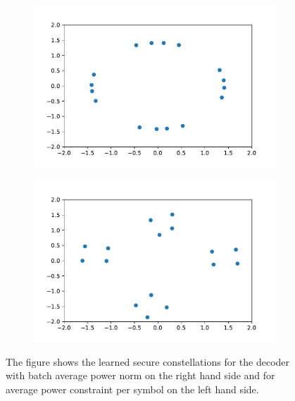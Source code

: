 \documentclass[conference]{IEEEtran}
\begin{document}
\begin{figure}
\centering
\begin{subfigure}{.25\textwidth}
  \centering
  \includegraphics[width=\linewidth]{const_circle_sec.pdf}
\end{subfigure}%
\begin{subfigure}{.25\textwidth}
  \centering
  \includegraphics[width=\linewidth]{const_avg_sec.pdf}
\end{subfigure}
\caption{The figure shows the learned secure constellations for the decoder with batch average power norm on the right hand side and for average power constraint per symbol on the left hand side. %
}
\label{fig:Encoding sec}
\end{figure}
\end{document}
